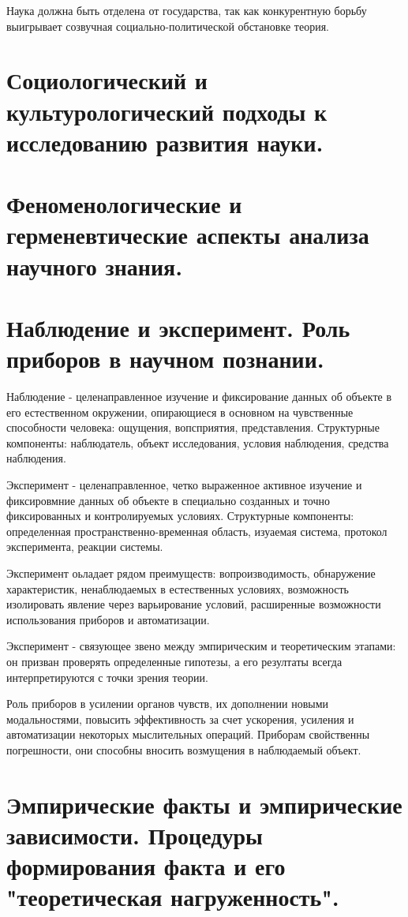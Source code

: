 \documentclass[12pt, specialist, subf, substylefile = spbu.rtx]{disser}
\begin{document}
Наука должна быть отделена от государства, так как конкурентную борьбу выигрывает созвучная социально-политической обстановке теория.

\section{Социологический и культурологический подходы к исследованию развития науки.}

\section{Феноменологические и герменевтические аспекты анализа научного знания.}

\section{Наблюдение и эксперимент. Роль приборов в научном познании.}
Наблюдение - целенаправленное изучение и фиксирование данных об объекте в его естественном окружении, опирающиеся в основном на чувственные способности человека: ощущения, вопсприятия, представления. Структурные компоненты: наблюдатель, объект исследования, условия наблюдения, средства наблюдения.

Эксперимент - целенаправленное, четко выраженное активное изучение и фиксировмние данных об объекте в специально созданных и точно фиксированных и контролируемых условиях. Структурные компоненты: определенная пространственно-временная область, изуаемая система, протокол эксперимента, реакции системы.

Эксперимент оьладает рядом преимуществ: вопроизводимость, обнаружение характеристик, ненаблюдаемых в естественных условиях, возможность изолировать явление через варьирование условий, расширенные возможности использования приборов и автоматизации.

Эксперимент - связующее звено между эмпирическим и теоретическим этапами: он призван проверять определенные гипотезы, а его резултаты всегда интерпретируются с точки зрения теории. 

Роль приборов в усилении органов чувств, их дополнении новыми модальностями, повысить эффективность за счет ускорения, усиления и автоматизации некоторых мыслительных операций. Приборам свойственны погрешности, они способны вносить возмущения в наблюдаемый объект.

\section{Эмпирические факты и эмпирические зависимости. Процедуры формирования факта и его "теоретическая нагруженность".}
\end{document}
